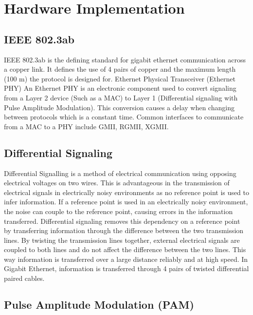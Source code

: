 \section{Hardware Implementation}

\subsection{IEEE 802.3ab}

\par IEEE 802.3ab is the defining standard for gigabit ethernet communication across a copper link. 
It defines the use of 4 pairs of copper and the maximum length (100 m) the protocol is designed for.
Ethernet Physical Transceiver (Ethernet PHY)
An Ethernet PHY is an electronic component used to convert signaling from a Layer 2 device (Such as a MAC) 
to Layer 1 (Differential signaling with Pulse Amplitude Modulation). This conversion causes a delay when 
changing between protocols which is a constant time. Common interfaces to communicate from a MAC to a PHY include 
GMII, RGMII, XGMII.

\subsection{Differential Signaling}

\par Differential Signalling is a method of electrical communication using opposing electrical voltages on two wires. 
This is advantageous in the transmission of electrical signals in electrically noisy environments as no reference 
point is used to infer information. If a reference point is used in an electrically noisy environment, the 
noise can couple to the reference point, causing errors in the information transferred. Differential signaling 
removes this dependency on a reference point by transferring information through the difference between the two 
transmission lines. By twisting the transmission lines together, external electrical signals are coupled to both 
lines and do not affect the difference between the two lines. This way information is transferred over a large 
distance reliably and at high speed. In Gigabit Ethernet, information is transferred through 4 pairs of twisted 
differential paired cables.

\subsection{Pulse Amplitude Modulation (PAM)}

